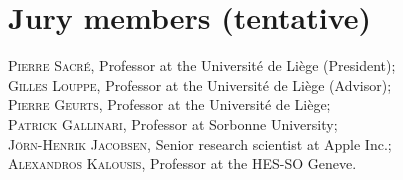 
\chapter*{Jury members (tentative)}


\noindent \textsc{Pierre Sacr{\'e}}, Professor at the Universit{\'e} de Li{\`e}ge (President); \\

\noindent \textsc{Gilles Louppe}, Professor at the Universit{\'e} de Li{\`e}ge (Advisor); \\

\noindent \textsc{Pierre Geurts}, Professor at the Universit{\'e} de Li{\`e}ge; \\

\noindent \textsc{Patrick Gallinari}, Professor at Sorbonne University; \\

\noindent \textsc{J{\"o}rn-Henrik Jacobsen}, Senior research scientist at Apple Inc.; \\

\noindent \textsc{Alexandros Kalousis}, Professor at the HES-SO Geneve. \\
